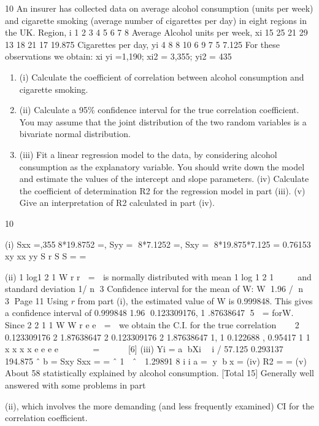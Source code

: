 \documentclass[a4paper,12pt]{article}
\begin{document}

10 An insurer has collected data on average alcohol consumption (units per week) and
cigarette smoking (average number of cigarettes per day) in eight regions in the UK.
Region, i 1 2 3 4 5 6 7 8 Average
Alcohol units per week, xi 15 25 21 29 13 18 21 17 19.875
Cigarettes per day, yi 4 8 8 10 6 9 7 5 7.125
For these observations we obtain:
  \sum xi yi =1,190; \sum xi2 = 3,355; \sum yi2 = 435
  \begin{enumerate}
\item (i) Calculate the coefficient of correlation between alcohol consumption and
cigarette smoking. 
\item (ii) Calculate a 95\% confidence interval for the true correlation coefficient. You may assume that the joint distribution of the two random variables is a
bivariate normal distribution. 
\item (iii) Fit a linear regression model to the data, by considering alcohol consumption as the explanatory variable. You should write down the model and estimate
the values of the intercept and slope parameters. 
(iv) Calculate the coefficient of determination R2 for the regression model in
part (iii). 
(v) Give an interpretation of R2 calculated in part (iv). 
\end{enumerate}
\newpage


10 \item (i) Sxx \;=,3558*19.8752 \;=,
Syy \;= 8*7.1252 \;=,
Sxy \;= 8*19.875*7.125 \;=
0.76153
xy
xx yy
S
r
S S
\;=\; \;=\; 
\item (ii) 1 log1
2 1
W r
r

\;=\;

is normally distributed with mean 1 log 1
2 1
 
 
and standard
deviation 1/ n 3
Confidence interval for the mean of W: W 1.96 / n  3
Page 11
Using $r$ from part (i), the estimated value of W is 0.999848.
This gives a confidence interval of
0.999848 1.96 0.123309176, 1 .87638647
5
 \;=\; forW.
Since
2
2
1
1
W
W
r e
e

\;=\;

we obtain the C.I. for the true correlation 
 
2 0.123309176 2 1.87638647
2 0.123309176 2 1.87638647
1, 1 0.122688 , 0.95417
1 1
x x
x x
e e
e e
   
  \;=\;
   
[6]
(iii) Yi \;=\; a bXi  i
/ 57.125 0.293137
194.875
ˆ b \;=\; Sxy Sxx \;=\; \;=\;
ˆ 1  ˆ  1.29891
8 i i a \;=\; y bx \;=\; 
(iv) R2 \;= \;= 
(v) About 58%
statistically explained by alcohol consumption. 
[Total 15]
Generally well answered with some problems in part \item (ii), which involves the more demanding
(and less frequently examined) CI for the correlation coefficient.
\end{document}
